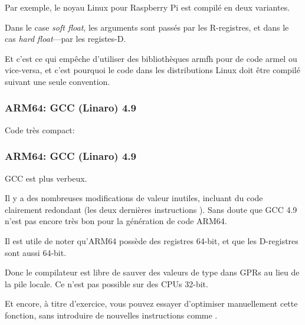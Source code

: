 Par exemple, le noyau Linux pour Raspberry Pi est compilé en deux variantes.

Dans le case \emph{soft float}, les arguments sont passés par les R-registres, et dans
le cas \emph{hard float}---par les registes-D.

Et c'est ce qui empêche d'utiliser des bibliothèques armfh pour de code armel ou
vice-versa, et c'est pourquoi le code dans les distributions Linux doit être compilé
suivant une seule convention.
\fi

\subsubsection{ARM64: GCC \Optimizing (Linaro) 4.9}

Code très compact:



\subsubsection{ARM64: GCC \NonOptimizing (Linaro) 4.9}



GCC \NonOptimizing est plus verbeux.

Il y a des nombreuses modifications de valeur inutiles, incluant du code clairement
redondant (les deux dernières instructions ). Sans doute que GCC 4.9 n'est
pas encore très bon pour la génération de code ARM64.

Il est utile de noter qu'ARM64 possède des registres 64-bit, et que les D-registres
sont aussi 64-bit.

Donc le compilateur est libre de sauver des valeurs de type \Tdouble dans \ac{GPR}s
au lieu de la pile locale.
Ce n'est pas possible sur des CPUs 32-bit.

Et encore, à titre d'exercice, vous pouvez essayer d'optimiser manuellement cette
fonction, sans introduire de nouvelles instructions comme .

